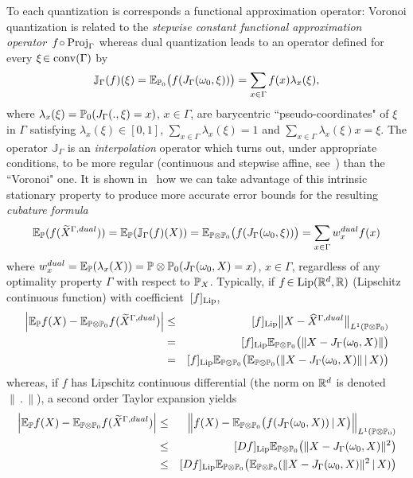  
To each  quantization is corresponds  a functional approximation operator:    Voronoi quantization is related to the {\em stepwise constant functional  approximation operator}~$f \!\circ {\rm Proj}_{\Gamma}$ whereas dual quantization leads  to an operator defined for every $\xi\!\in\operatorname{conv}(\Gamma)$ by
\begin{equation}\label{eq:JGAmma}
\mathbb{J}_{\Gamma}(f)(\xi)= \E_{\Prob_0}\big(f(J_{\Gamma}(\omega_0,\xi))\big)= \sum_{x\in \Gamma} f(x)\lambda_x(\xi),
\end{equation} 
where $\lambda_x(\xi)=\mathbb{P}_0(J_{\Gamma}(.,\xi)=x)$, $x\!\in \Gamma$, are barycentric ``pseudo-coordinates" of $\xi$ in $\Gamma$ satisfying $\lambda_x(\xi)\!\in [0,1]$, $\sum_{x\in \Gamma} \lambda_x(\xi) =1$ and $\sum_{x\in \Gamma} \lambda_x(\xi) x=\xi$. The operator $\mathbb{J}_{\Gamma}$  is an {\em interpolation} operator which turns out,  under appropriate conditions, to be  more regular (continuous and stepwise affine, see~\cite{dualAppl}) than the ``Voronoi" one.
 It is shown  in~\cite{dualStat,cdo,dualAppl} how we can take advantage of this intrinsic stationary property to  produce more accurate error bounds for the resulting  {\em cubature formula}
 \begin{equation}\label{eq:cubature}
\E_{\Prob}(f(\widetilde X^{\Gamma,dual}))=  \E_{\Prob}(\mathbb{J}_{\Gamma}(f)(X))=   \E_{\Prob\otimes\Prob_0} \big(f(J_{\Gamma}(\omega_0,\xi))\big)= \sum_{x\in \Gamma}w_x^{dual}f(x) 
 \end{equation}
where $w_x^{dual} = \mathbb{E}_{\mathbb{P}}(\lambda_x(X))= \mathbb{P}\otimes\mathbb{P}_0(J_{\Gamma}(\omega_0,X)=x)$, $x\!\in \Gamma$, regardless of any optimality property  $\Gamma$ with respect to   $\mathbb{P}_{X}$.   Typically, if  $f\! \in {\rm Lip}(\mathbb{R}^d,\mathbb{R})$ (Lipschitz continuous function)  with  coefficient~$[f]_{\rm Lip}$, 
\begin{eqnarray*}
  \Big|\mathbb{E}_{\mathbb{P}}f(X)-\mathbb{E}_{\mathbb{P}\otimes\mathbb{P}_0}f(\widetilde X^{\Gamma,dual})\Big|&\le& [f]_{\rm Lip}\big\|X-\widehat X^{\Gamma,dual}\big\|_{L^1(\mathbb{P}\otimes\mathbb{P}_0)}\\&=&  [f]_{\rm Lip}\mathbb{E}_{\mathbb{P} \otimes \mathbb{P}_0}\big(\|X-J_{\Gamma}(\omega_0,X)\| \big)   \\
  &=& [f]_{\rm Lip}\mathbb{E}_{\mathbb{P} \otimes \mathbb{P}_0}\big(\mathbb{E}_{\mathbb{P} \otimes \mathbb{P}_0}(\|X-J_{\Gamma}(\omega_0,X)\|  \,|\,X)  \big)   
\end{eqnarray*}
whereas, if $f$ has Lipschitz continuous differential (the norm on $\mathbb{R}^d$ is denoted $\|\,.\,\|$), a second order Taylor expansion yields
\begin{eqnarray}
\nonumber    \Big|\E_{\Prob}f(X)-\E_{\Prob\otimes\Prob_0}f(\widetilde X^{\Gamma,dual})\Big|&\le& \Big\|f(X) -\E_{\Prob \otimes \Prob_0}\big(f(J_{\Gamma}(\omega_0,X))\,|\,X\big) \Big\|_{L^1(\Prob\otimes\Prob_0)}    \\
\nonumber     &\le& [ Df]_{\rm Lip}\E_{\Prob \otimes \Prob_0}\big(\|X-J_{\Gamma}(\omega_0,X)\|^2  \big)  \\
  &\le& [ Df]_{\rm Lip}\E_{\Prob \otimes \Prob_0}\big(\E_{\Prob \otimes \Prob_0}(\|X-J_{\Gamma}(\omega_0,X)\|^2  \,|\,X)  \big)   \label{eq:fstatiodual}
\end{eqnarray}
